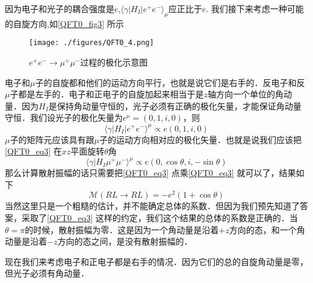 因为电子和光子的耦合强度是$e$,$\langle \gamma | H_I | e^+ e^- \rangle_\mu$应正比于$e$. 我们接下来考虑一种可能的自旋方向,如\autoref{QFT0_fig3} 所示
\begin{figure}[ht]
\centering
\texttt{[image: ./figures/QFT0\_4.png]}
\caption{$e^+e^-\rightarrow\mu^+\mu^-$过程的极化示意图} \label{QFT0_fig4}
\end{figure}
电子和$\mu$子的自旋都和他们的运动方向平行，也就是说它们是右手的．反电子和反$\mu$子都是左手的．电子和正电子的自旋加起来相当于是$z$轴方向一个单位的角动量．因为$H_I$是保持角动量守恒的，光子必须有正确的极化矢量，才能保证角动量守恒．我们设光子的极化矢量为$\epsilon^\mu =(0,1,i,0)$，则
\begin{equation}
\langle \gamma | H_I | e^+ e^- \rangle^\mu \propto e (0,1,i ,0)
\end{equation}
$\mu$子的矩阵元应该具有跟$\mu$子的运动方向相对应的极化矢量．也就是说我们应该把\autoref{QFT0_eq3} 在$xz$平面旋转$\theta$角
\begin{equation}
\langle \gamma| H_I \mu^+\mu^-\rangle^\mu \propto e (0,\cos\theta, i, - \sin\theta) 
\end{equation}
那么计算散射振幅的话只需要把\autoref{QFT0_eq3} 点乘\autoref{QFT0_eq3} 就可以了，结果如下
\begin{equation}
\mathcal M(RL\rightarrow RL) = - e^2 (1+\cos\theta)
\end{equation}
当然这里只是一个粗糙的估计，并不能确定总体的系数．但因为我们预先知道了答案，采取了\autoref{QFT0_eq3} 这样的约定，我们这个结果的总体的系数是正确的．当$\theta = \pi$的时候，散射振幅为零．这是因为一个角动量是沿着$+z$方向的态，和一个角动量是沿着$-z$方向的态之间，是没有散射振幅的．

现在我们来考虑电子和正电子都是右手的情况．因为它们的总的自旋角动量是零，但光子必须有角动量．

























